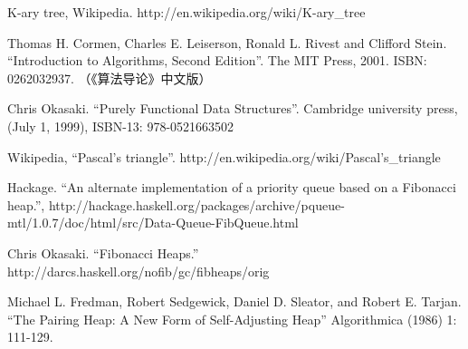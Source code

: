 \documentclass[UTF8]{article}
\begin{document}
\ifx\wholebook\relax \else
\begin{thebibliography}{99}

K-ary tree, Wikipedia. http://en.wikipedia.org/wiki/K-ary\_tree

Thomas H. Cormen, Charles E. Leiserson, Ronald L. Rivest and Clifford Stein. ``Introduction to Algorithms, Second Edition''. The MIT Press, 2001. ISBN: 0262032937. （《算法导论》中文版）

Chris Okasaki. ``Purely Functional Data Structures''. Cambridge university press, (July 1, 1999), ISBN-13: 978-0521663502

Wikipedia, ``Pascal's triangle''. http://en.wikipedia.org/wiki/Pascal's\_triangle

Hackage. ``An alternate implementation of a priority queue based on a Fibonacci heap.'', http://hackage.haskell.org/packages/archive/pqueue-mtl/1.0.7/doc/html/src/Data-Queue-FibQueue.html

Chris Okasaki. ``Fibonacci Heaps.'' http://darcs.haskell.org/nofib/gc/fibheaps/orig

Michael L. Fredman, Robert Sedgewick, Daniel D. Sleator, and Robert E. Tarjan. ``The Pairing Heap: A New Form of Self-Adjusting Heap'' Algorithmica (1986) 1: 111-129.

\end{thebibliography}
\end{document}
